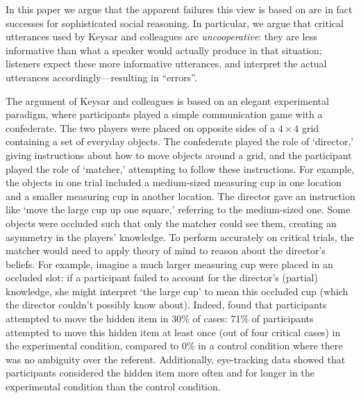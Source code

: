 \documentclass[10pt,letterpaper]{article}
\begin{document}
In this paper we argue that the apparent failures this view is based on are in fact successes for sophisticated social reasoning. 
In particular, we argue that critical utterances used by Keysar and colleagues are \emph{uncooperative}: they are less informative than what a speaker would actually produce in that situation; listeners expect these more informative utterances, and interpret the actual utterances accordingly---resulting in ``errors''.

The argument of Keysar and colleagues is based on an elegant experimental paradigm, where participants played a simple communication game with a confederate. The two players were placed on opposite sides of a $4 \times 4$ grid containing a set of everyday objects.
The confederate played the role of `director,' giving instructions about how to move objects around a grid, and the participant played the role of `matcher,' attempting to follow these instructions. For example, the objects in one trial included a medium-sized measuring cup in one location and a smaller measuring cup in another location. The director gave an instruction like `move the large cup up one square,' referring to the medium-sized one. 
Some objects were occluded such that only the matcher could see them, creating an asymmetry in the players' knowledge. To perform accurately on critical trials, the matcher would need to apply theory of mind to reason about the director's beliefs. For example, imagine a much larger measuring cup were placed in an occluded slot: if a participant failed to account for the director's (partial) knowledge, she might interpret `the large cup' to mean this occluded cup (which the director couldn't possibly know about). 
Indeed,  found that participants attempted to move the hidden item in 30\% of cases: 71\% of participants attempted to move this hidden item at least once (out of four critical cases) in the experimental condition, compared to 0\% in a control condition where there was no ambiguity over the referent. 
Additionally, eye-tracking data showed that participants considered the hidden item more often and for longer in the experimental condition than the control condition. 
\end{document}
